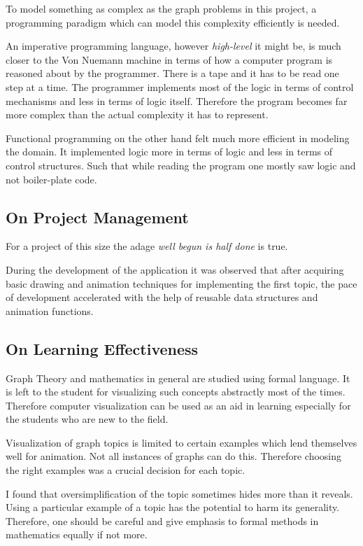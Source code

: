  To model something as complex as the graph problems in this project, a programming paradigm which can model this complexity efficiently is needed. 

An imperative programming language, however \emph{high-level} it might be, is
much closer to the Von Nuemann machine in terms of how a computer program is
reasoned about by the programmer. There is a tape and it has to be read one
step at a time. The programmer implements most of the logic in terms of control
mechanisms and less in terms of logic itself. Therefore the program becomes far
more complex than the actual complexity it has to represent. 

Functional programming on the other hand felt much more efficient in modeling
the domain. It implemented logic more in terms of logic and less in terms of
control structures. Such that while reading the program one mostly saw logic
and not boiler-plate code.

\subsection{On Project Management}
For a project of this size the adage \emph{well begun is half done} is true.

During the development of the application it was observed that after acquiring
basic drawing and animation techniques for implementing the first topic, the
pace of development accelerated with the help of reusable data structures and
animation functions.

\subsection{On Learning Effectiveness}

Graph Theory and mathematics in general are studied using formal language. It
is left to the student for visualizing such concepts abstractly most of the
times. Therefore computer visualization can be used as an aid in learning
especially for the students who are new to the field.

Visualization of graph topics is limited to certain examples which lend
themselves well for animation. Not all instances of graphs can do this.
Therefore choosing the right examples was a crucial decision for each topic.

I found that oversimplification of the topic sometimes
hides more than it reveals. Using a particular example of a topic has the
potential to harm its generality. Therefore, one should be careful and give
emphasis to formal methods in mathematics equally if not more.

